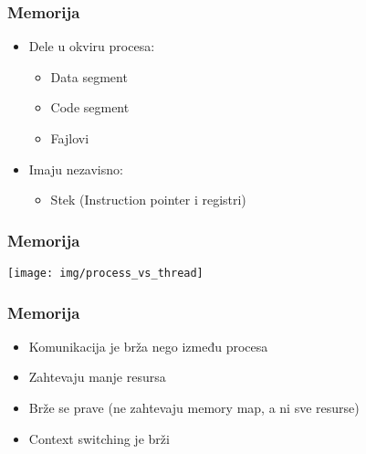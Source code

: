 \documentclass{beamer}
\begin{document}
\begin{frame}
    \frametitle{Memorija}
    \begin{itemize}
        \item Dele u okviru procesa: \begin{itemize}
            \item Data segment \newline
            \item Code segment \newline
            \item Fajlovi \newline
        \end{itemize}
        \item Imaju nezavisno: \begin{itemize}
            \item Stek (Instruction pointer i registri)\newline
        \end{itemize}
    \end{itemize}   
\end{frame}

\begin{frame}
    \frametitle{Memorija}
    \begin{center}
        \texttt{[image: img/process\_vs\_thread]}
    \end{center}
\end{frame}

\begin{frame}
    \frametitle{Memorija}
    \begin{itemize}
        \item Komunikacija je brža nego između procesa \newline
        \item Zahtevaju manje resursa \newline
        \item Brže se prave (ne zahtevaju memory map, a ni sve resurse)
        \item Context switching je brži
    \end{itemize}
\end{frame}
\end{document}
